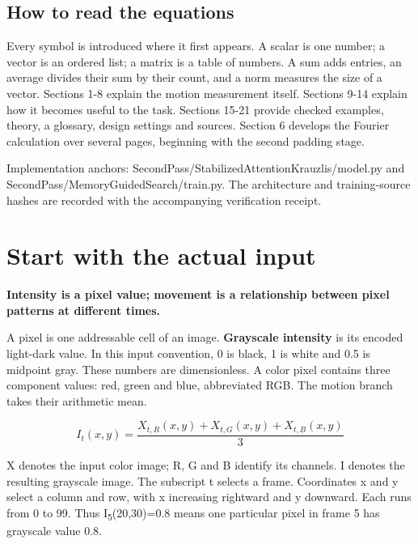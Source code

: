 \documentclass[11pt,letterpaper]{article}
\begin{document}
\subsection*{How to read the equations}

Every symbol is introduced where it first appears. A scalar is one number; a vector is an ordered list; a matrix is a table of numbers. A sum adds entries, an average divides their sum by their count, and a norm measures the size of a vector. Sections 1-8 explain the motion measurement itself. Sections 9-14 explain how it becomes useful to the task. Sections 15-21 provide checked examples, theory, a glossary, design settings and sources. Section 6 develops the Fourier calculation over several pages, beginning with the second padding stage.


{
\small\color{muted} Implementation anchors: SecondPass/\allowbreak{}StabilizedAttentionKrauzlis/\allowbreak{}model.py and SecondPass/\allowbreak{}MemoryGuidedSearch/\allowbreak{}train.py. The architecture and training-source hashes are recorded with the accompanying verification receipt.\par}


\clearpage


\clearpage
{\small\setlength{\parskip}{0pt}\tableofcontents}
\clearpage

\section{Start with the actual input}\label{sec1}

\textbf{Intensity is a pixel value; movement is a relationship between pixel patterns at different times.}


A pixel is one addressable cell of an image. \textbf{Grayscale intensity} is its encoded light-dark value. In this input convention, 0 is black, 1 is white and 0.5 is midpoint gray. These numbers are dimensionless. A color pixel contains three component values: red, green and blue, abbreviated RGB. The motion branch takes their arithmetic mean.


\begin{equation}I_t(x,y)=\frac{X_{t,R}(x,y)+X_{t,G}(x,y)+X_{t,B}(x,y)}{3}\end{equation}

X denotes the input color image; R, G and B identify its channels. I denotes the resulting grayscale image. The subscript t selects a frame. Coordinates x and y select a column and row, with x increasing rightward and y downward. Each runs from 0 to 99. Thus I\textsubscript{5}(20,30)=0.8 means one particular pixel in frame 5 has grayscale value 0.8.
\end{document}
